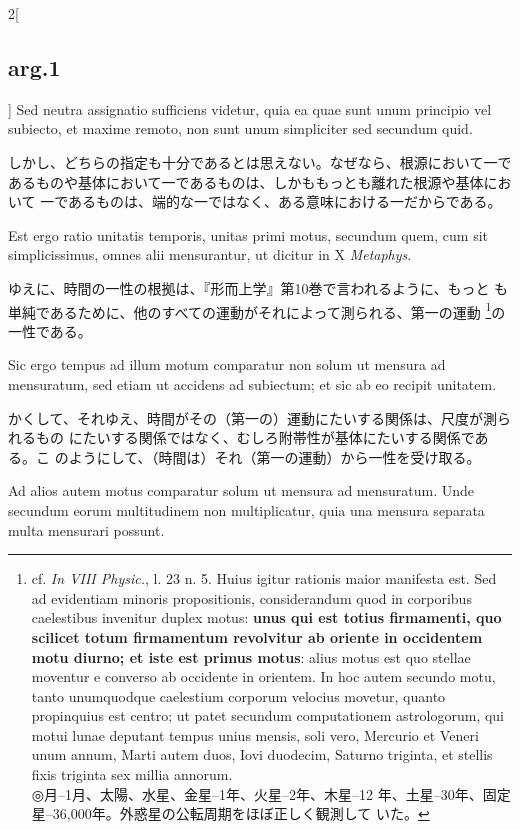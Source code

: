 \documentclass[paper=a4paper,fontsize=10pt,jafontsize=9pt,titlepage]{jlreq}
\begin{document}
\begin{paracol}{2}[\subsection{arg.1}]
Sed neutra assignatio sufficiens videtur, quia ea quae sunt
unum principio vel subiecto, et maxime remoto, non sunt unum simpliciter
sed secundum quid.

\switchcolumn

しかし、どちらの指定も十分であるとは思えない。なぜなら、根源において一で
あるものや基体において一であるものは、しかももっとも離れた根源や基体において
一であるものは、端的な一ではなく、ある意味における一だからである。

\switchcolumn*

Est ergo ratio unitatis temporis, unitas primi motus, secundum quem, cum
sit simplicissimus, omnes alii mensurantur, ut dicitur in X {\itshape Metaphys}.

\switchcolumn

ゆえに、時間の一性の根拠は、『形而上学』第10巻で言われるように、もっと
も単純であるために、他のすべての運動がそれによって測られる、第一の運動
\footnote{cf. {\itshape In VIII Physic.}, l. 23 n. 5. Huius igitur rationis
maior manifesta est. Sed ad evidentiam minoris propositionis,
considerandum quod in corporibus caelestibus invenitur duplex motus:
{\bfseries unus qui est totius firmamenti, quo scilicet totum firmamentum
revolvitur ab oriente in occidentem motu diurno; et iste est primus
motus}: alius motus est quo stellae moventur e converso ab occidente
in orientem. In hoc autem secundo motu, tanto unumquodque caelestium
corporum velocius movetur, quanto propinquius est centro; ut patet
secundum computationem astrologorum, qui motui lunae deputant tempus
unius mensis, soli vero, Mercurio et Veneri unum annum, Marti autem
duos, Iovi duodecim, Saturno triginta, et stellis fixis triginta sex
millia annorum.\\◎月--1月、太陽、水星、金星--1年、火星--2年、木星--12
年、土星--30年、固定星--36,000年。外惑星の公転周期をほぼ正しく観測して
いた。}の一性である。

\switchcolumn*

Sic ergo tempus ad illum motum comparatur non solum ut mensura ad
mensuratum, sed etiam ut accidens ad subiectum; et sic ab eo recipit
unitatem.

\switchcolumn

かくして、それゆえ、時間がその（第一の）運動にたいする関係は、尺度が測られるもの
にたいする関係ではなく、むしろ附帯性が基体にたいする関係である。こ
のようにして、（時間は）それ（第一の運動）から一性を受け取る。

\switchcolumn*

Ad alios autem motus comparatur solum ut
mensura ad mensuratum. Unde secundum eorum multitudinem non
multiplicatur, quia una mensura separata multa mensurari possunt.


\end{paracol}
\end{document}
